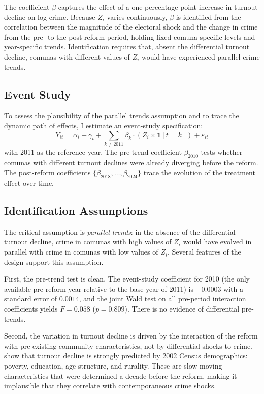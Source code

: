 \documentclass[12pt]{article}
\begin{document}
The coefficient $\beta$ captures the effect of a one-percentage-point increase in turnout decline on log crime. Because $Z_i$ varies continuously, $\beta$ is identified from the correlation between the magnitude of the electoral shock and the change in crime from the pre- to the post-reform period, holding fixed comuna-specific levels and year-specific trends. Identification requires that, absent the differential turnout decline, comunas with different values of $Z_i$ would have experienced parallel crime trends.

\subsection{Event Study}

To assess the plausibility of the parallel trends assumption and to trace the dynamic path of effects, I estimate an event-study specification:
\begin{equation}\label{eq:event}
Y_{it} = \alpha_i + \gamma_t + \sum_{k \neq 2011} \beta_k \cdot (Z_i \times \mathbf{1}[t = k]) + \varepsilon_{it}
\end{equation}
with 2011 as the reference year. The pre-trend coefficient $\beta_{2010}$ tests whether comunas with different turnout declines were already diverging before the reform. The post-reform coefficients $\{\beta_{2018}, \ldots, \beta_{2024}\}$ trace the evolution of the treatment effect over time.

\subsection{Identification Assumptions}

The critical assumption is \textit{parallel trends}: in the absence of the differential turnout decline, crime in comunas with high values of $Z_i$ would have evolved in parallel with crime in comunas with low values of $Z_i$. Several features of the design support this assumption.

First, the pre-trend test is clean. The event-study coefficient for 2010 (the only available pre-reform year relative to the base year of 2011) is $-0.0003$ with a standard error of $0.0014$, and the joint Wald test on all pre-period interaction coefficients yields $F = 0.058$ ($p = 0.809$). There is no evidence of differential pre-trends.

Second, the variation in turnout decline is driven by the interaction of the reform with pre-existing community characteristics, not by differential shocks to crime. \citet{Cox2022} show that turnout decline is strongly predicted by 2002 Census demographics: poverty, education, age structure, and rurality. These are slow-moving characteristics that were determined a decade before the reform, making it implausible that they correlate with contemporaneous crime shocks.
\end{document}
